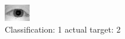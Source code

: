 \begin{figure}[h!]
\begin{center}
\includegraphics[width=0.60\columnwidth]{figures/ID969_class_1_target_2.png}
\end{center}
\caption{ Classification: 1 actual target: 2}
\label{fig:ID969_class_1_target_2}
\end{figure}
